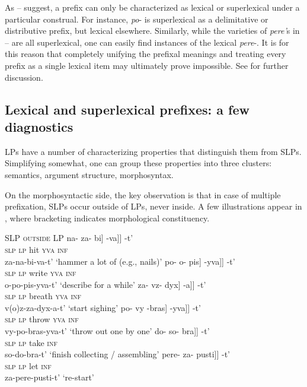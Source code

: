 \documentclass[output=paper,colorlinks,citecolor=brown]{langscibook}
\begin{document}
\noindent As -- suggest, a prefix can only be characterized as lexical or superlexical under a particular construal. For instance, \textit{po}- is superlexical as a delimitative or distributive prefix, but lexical elsewhere. Similarly, while the varieties of \textit{pere’}s in -- are all superlexical, one can easily find instances of the lexical \textit{pere}-. It is for this reason that completely unifying the prefixal meanings and treating every prefix as a single lexical item may ultimately prove impossible. See  for further discussion. 

\subsection{Lexical and superlexical prefixes: a few diagnostics}\label{sec:1.4}
\hypertarget{RefHeadingToc164647620}{}
LPs have a number of characterizing properties that distinguish them from SLPs. Simplifying somewhat, one can group these properties into three clusters: semantics, argument structure, morphosyntax. 

On the morphosyntactic side, the key observation is that in case of multiple prefixation, SLPs occur outside of LPs, never inside. A few illustrations appear in , where bracketing indicates morphological constituency.

\ea   \textsc{SLP outside LP}  \label{ex:tatevosov:21}%
\ea \gll \minsp{[} na- \minsp{[[} za- bi] -va]] -t’\\
    {} \textsc{slp} {} \textsc{lp} hit \textsc{yva} \textsc{inf}\\\hfill *za-na-bi-va-t’
\glt  ‘hammer a lot of (e.g., nails)’\label{ex:tatevosov:21a}
\ex \gll    \minsp{[} po- \minsp{[[} o- pis] -yva]] -t’\\
    {} \textsc{slp} {} \textsc{lp} write \textsc{yva} \textsc{inf}\\\hfill *o-po-pis-yva-t’
\glt    ‘describe for a while’\label{ex:tatevosov:21b}
\ex \gll    \minsp{[} za- \minsp{[[} vz- dyx] -a]] -t’  \\
{} \textsc{slp} {} \textsc{lp} breath \textsc{yva} \textsc{inf}\\\hfill  *v(o)z-za-dyx-a-t’ 
\glt    ‘start sighing’\label{ex:tatevosov:21c}
\ex \gll   \minsp{[} po- \minsp{[[} vy -bras] -yva]] -t’   \\
{} \textsc{slp} {} \textsc{lp} throw \textsc{yva} \textsc{inf}\\\hfill *vy-po-bras-yva-t’
\glt ‘throw out one by one’\label{ex:tatevosov:21d}
\ex \gll   \minsp{[} do- \minsp{[} so- bra]] -t’   \\
{} \textsc{slp} {} \textsc{lp} take \textsc{inf}\\\hfill *so-do-bra-t’
\glt ‘finish collecting / assembling’\label{ex:tatevosov:21e}
\ex \gll   \minsp{[} pere- \minsp{[} za- pusti]] -t’   \\
{} \textsc{slp} {} \textsc{lp} let \textsc{inf}\\\hfill *za-pere-pusti-t’
\glt ‘re-start’\label{ex:tatevosov:21f}
\z
\z
\end{document}

